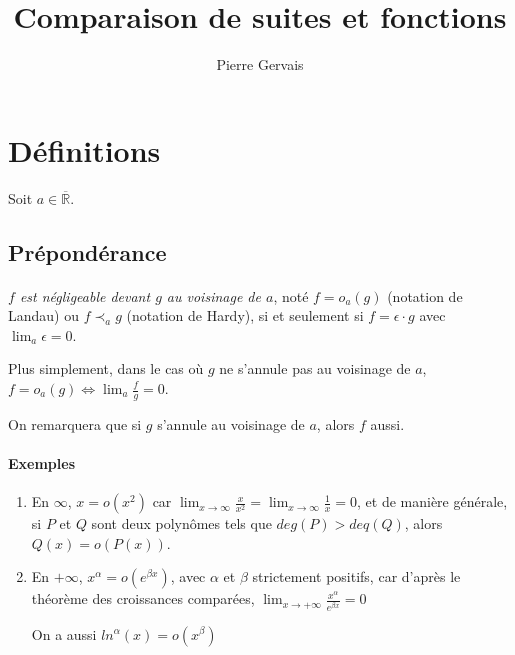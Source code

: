 \documentclass[]{article}
\title{Comparaison de suites et fonctions}
\author{Pierre Gervais}
\begin{document}
\maketitle

\section{Définitions}

Soit $a \in \overline{\mathbb{R}}$.

\subsection{Prépondérance}

\paragraph[Définition]{}
\textit{$f$ est négligeable devant $g$ au voisinage de $a$}, noté $f=o_a(g)$ (notation de Landau) ou $f \prec_a g$ (notation de Hardy), si et seulement si $f = \epsilon \cdot g$ avec $\displaystyle \lim_a \epsilon = 0$.

Plus simplement, dans le cas où $g$ ne s'annule pas au voisinage de $a$, $\displaystyle f=o_a(g) \Leftrightarrow \lim_a \frac{f}{g}=0$.

On remarquera que si $g$ s'annule au voisinage de $a$, alors $f$ aussi.

\paragraph{Exemples}
\begin{enumerate}
	\item En $\infty$, $x=o(x^2)$ car $\displaystyle  \lim_{x \to \infty}\frac{x}{x^2}=\lim_{x \to \infty}\frac{1}{x}=0$, et de manière générale, si $P$ et $Q$ sont deux polynômes tels que $deg(P) > deq(Q)$, alors $Q(x)=o(P(x))$.

    \item En $+ \infty$, $x^\alpha=o(e^{\beta x})$, avec $\alpha$ et $\beta$ strictement positifs, car d'après le théorème des croissances comparées, $\displaystyle \lim_{x \to +\infty} \frac{x^\alpha}{e^{\beta x}} = 0$
    
    On a aussi $ln^\alpha(x)=o(x^\beta)$
\end{enumerate}
\end{document}
